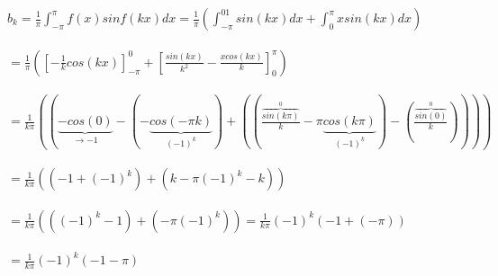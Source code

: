 \documentclass[12pt,a4paper]{article}
\begin{document}
$b_k=\frac{1}{\pi}\int_{-\pi}^\pi f(x)sinf(kx)dx = \frac{1}{\pi}(\int_{-\pi}^01sin(kx)dx+\int_0^\pi xsin(kx)dx)$\\
\\
$=\frac{1}{\pi}(\left[-\frac{1}{k}cos(kx)\right]_{-\pi}^0+\left[\frac{sin(kx)}{k^2}-\frac{xcos(kx)}{k}\right]_0^\pi)$\\
\\
$=\frac{1}{k\pi}((\underbrace{-cos(0)}_{\rightarrow -1}-(-\underbrace{cos(-\pi k)}_{(-1)^k})+((\frac{\overbrace{sin(k\pi)}^{0}}{k}-\pi \underbrace{cos(k\pi)}_{(-1)^k})-(\frac{\overbrace{sin(0)}^{0}}{k}))))$\\
\\
$=\frac{1}{k\pi}((-1+(-1)^k)+(k-\pi (-1)^k -k))$\\
\\
$=\frac{1}{k\pi}(((-1)^k-1)+(-\pi (-1)^k))= \frac{1}{k\pi}(-1)^k(-1+(-\pi))$\\
\\
$=\frac{1}{k\pi}(-1)^k(-1-\pi)$\\
\end{document}
